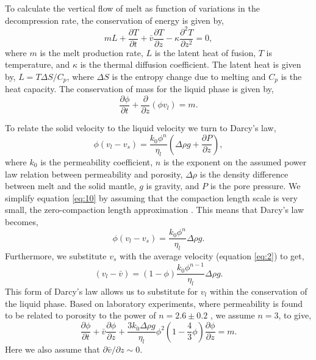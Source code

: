 \documentclass[draft,grl]{agutexSI2018}
\begin{document}
\begin{article}
To calculate the vertical flow of melt as function of variations in the decompression rate, the conservation of energy is given by,
\begin{equation}
mL + \frac{\partial T}{\partial t} + \bar{v}\frac{\partial T}{\partial z} - \kappa\frac{\partial^{2} T}{\partial z^{2}} = 0,
\label{eq:8}
\end{equation}
where $m$ is the melt production rate, $L$ is the latent heat of fusion, $T$ is temperature, and $\kappa$ is the thermal diffusion coefficient. The latent heat is given by, $L = T\Delta S/C_{p}$, where $\Delta S$ is the entropy change due to melting and $C_{p}$ is the heat capacity. The conservation of mass for the liquid phase is given by,
\begin{equation}
\frac{\partial \phi}{\partial t} + \frac{\partial}{\partial z}\left(\phi v_{l}\right) = m.
\label{eq:9}
\end{equation}

To relate the solid velocity to the liquid velocity we turn to Darcy's law,
\begin{equation}
\phi\left(v_{l}-v_{s}\right) = \frac{k_{0}\phi^{n}}{\eta_{l}}\left(\Delta\rho g + \frac{\partial P}{\partial z}\right),
\label{eq:10}
\end{equation}
where $k_{0}$ is the permeability coefficient, $n$ is the exponent on the assumed power law relation between permeability and porosity, $\Delta\rho$ is the density difference between melt and the solid mantle, $g$ is gravity, and $P$ is the pore pressure. We simplify equation \ref{eq:10} by assuming that the compaction length scale is very small, the zero-compaction length approximation \citep{ribe-1985}. This means that Darcy's law becomes,
\begin{equation}
\phi\left(v_{l}-v_{s}\right) = \frac{k_{0}\phi^{n}}{\eta_{l}} \Delta\rho g.
\label{eq:11}
\end{equation}
Furthermore, we substitute $v_{s}$ with the average velocity (equation \ref{eq:2}) to get,
\begin{equation}
\left(v_{l}-\bar{v}\right) = \left(1-\phi\right)\frac{k_{0}\phi^{n-1}}{\eta_{l}} \Delta\rho g.
\label{eq:12}
\end{equation}
This form of Darcy's law allows us to substitute for $v_{l}$ within the conservation of the liquid phase. Based on laboratory experiments, where permeability is found to be related to porosity to the power of $n = 2.6\pm0.2$ \citep{miller-etal-2014}, we assume $n=3$, to give,
\begin{equation}
\frac{\partial \phi}{\partial t} + \bar{v} \frac{\partial \phi}{\partial z} + \frac{3k_{0}\Delta\rho g}{\eta_{l}} \phi^{2}\left(1-\frac{4}{3}\phi\right)\frac{\partial \phi}{\partial z} = m.
\label{eq:13}
\end{equation}
Here we also assume that $\partial\bar{v}/\partial z \sim 0$.


\end{article}
\end{document}
